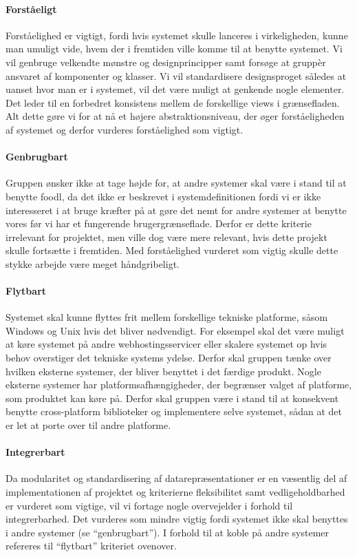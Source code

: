 \paragraph{Forståeligt} Forståelighed er vigtigt, fordi hvis systemet skulle lanceres i virkeligheden, kunne man umuligt vide, hvem der i fremtiden ville komme til at benytte systemet. Vi vil genbruge velkendte mønstre og designprincipper samt forsøge at gruppèr ansvaret af komponenter og klasser. Vi vil standardisere designsproget således at uanset hvor man er i systemet, vil det være muligt at genkende nogle elementer. Det leder til en forbedret konsistens mellem de forskellige views i grænsefladen. Alt dette gøre vi for at nå et højere abstraktionsniveau, der øger forståeligheden af systemet og derfor vurderes forståelighed som vigtigt. 
 
\paragraph{Genbrugbart} Gruppen ønsker ikke at tage højde for, at andre systemer skal være i stand til at benytte foodl, da det ikke er beskrevet i systemdefinitionen fordi vi er ikke interesseret i at bruge kræfter på at gøre det nemt for andre systemer at benytte vores før vi har et fungerende brugergrænseflade. Derfor er dette kriterie irrelevant for projektet, men ville dog være mere relevant, hvis dette projekt skulle fortsætte i fremtiden. Med forståelighed vurderet som vigtig skulle dette stykke arbejde være meget håndgribeligt.

\paragraph{Flytbart} Systemet skal kunne flyttes frit mellem forskellige tekniske platforme, såsom Windows og Unix hvis det bliver nødvendigt. For eksempel skal det være muligt at køre systemet på andre webhostingsservicer eller skalere systemet op hvis behov overstiger det tekniske systems ydelse. Derfor skal gruppen tænke over hvilken eksterne systemer, der bliver benyttet i det færdige produkt. Nogle eksterne systemer har platformsafhængigheder, der begrænser valget af platforme, som produktet kan køre på. Derfor skal gruppen være i stand til at konsekvent benytte cross-platform biblioteker og implementere selve systemet, sådan at det er let at porte over til andre platforme.

\paragraph{Integrerbart} Da modularitet og standardisering af datarepræsentationer er en væsentlig del af implementationen af projektet og kriterierne fleksibilitet samt vedligeholdbarhed er vurderet som vigtige, vil vi fortage nogle overvejelder i forhold til integrerbarhed. Det vurderes som mindre vigtig fordi systemet ikke skal benyttes i andre systemer (se ``genbrugbart''). I forhold til at koble på andre systemer refereres til ``flytbart'' kriteriet ovenover.


